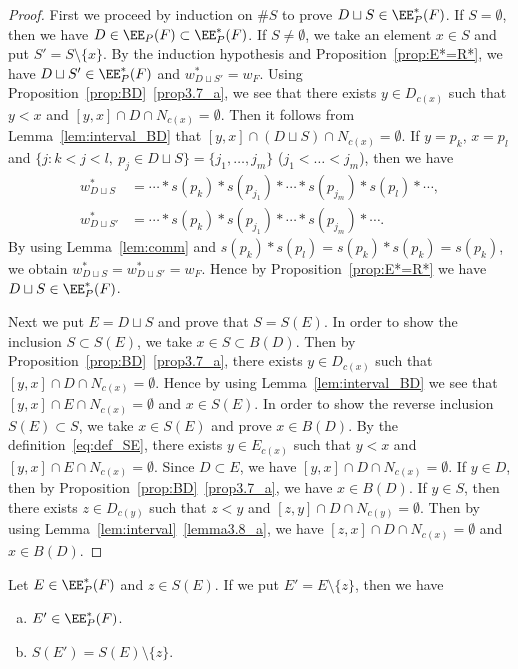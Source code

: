 \begin{proof}
First we proceed by induction on $\# S$ to prove $D \sqcup S \in \EE^*_P(F)$.
If $S = \emptyset$, then we have $D \in \EE_P(F) \subset \EE^*_P(F)$.
If $S \neq \emptyset$, we take an element $x \in S$ and put $S' = S \setminus \{ x \}$.
By the induction hypothesis and Proposition~\ref{prop:E*=R*}, 
we have $D \sqcup S' \in \EE^*_P(F)$ and $w^*_{D \sqcup S'} = w_F$.
Using Proposition~\ref{prop:BD}~\ref{prop3.7_a}, we see that there exists $y \in D_{c(x)}$ 
such that $y<x$ and $[y,x] \cap D \cap N_{c(x)} = \emptyset$.
Then it follows from Lemma~\ref{lem:interval_BD} that $[y,x] \cap (D \sqcup S) \cap N_{c(x)} = \emptyset$.
If $y = p_k$, $x = p_l$ and $\{ j : k < j < l, \ p_j \in D \sqcup S \} = \{ j_1, \dots, j_m \}$ 
($j_1 < \dots < j_m$), then we have 
\begin{align*}
w^*_{D \sqcup S} &= \cdots * s(p_k) * s(p_{j_1}) * \cdots * s(p_{j_m}) * s(p_l) * \cdots,
\\
w^*_{D \sqcup S'} &= \cdots * s(p_k) * s(p_{j_1}) * \cdots * s(p_{j_m}) * \cdots.
\end{align*}
By using Lemma~\ref{lem:comm} and $s(p_k)*s(p_l) = s(p_k) * s(p_k) = s(p_k)$, 
we obtain $w^*_{D \sqcup S} = w^*_{D \sqcup S'} = w_F$.
Hence by Proposition~\ref{prop:E*=R*} we have $D \sqcup S \in \EE^*_P(F)$.

Next we put $E = D \sqcup S$ and prove that $S = S(E)$.
In order to show the inclusion $S \subset S(E)$, we take $x \in S \subset B(D)$.
Then by Proposition~\ref{prop:BD}~\ref{prop3.7_a}, there exists $y \in D_{c(x)}$ 
such that $[y,x] \cap D \cap N_{c(x)} = \emptyset$.
Hence by using Lemma~\ref{lem:interval_BD} we see that $[y,x] \cap E \cap N_{c(x)} = \emptyset$ 
and $x \in S(E)$.
In order to show the reverse inclusion $S(E) \subset S$, we take $x \in S(E)$ and prove $x \in B(D)$.
By the definition~\eqref{eq:def_SE}, there exists $y \in E_{c(x)}$ 
such that $y < x$ and $[y,x] \cap E \cap N_{c(x)} = \emptyset$.
Since $D \subset E$, we have $[y,x] \cap D \cap N_{c(x)} = \emptyset$.
If $y \in D$, then by Proposition~\ref{prop:BD}~\ref{prop3.7_a}, we have $x \in B(D)$.
If $y \in S$, then there exists $z \in D_{c(y)}$ such that $z<y$ and $[z,y] \cap D \cap N_{c(y)} = \emptyset$.
Then by using Lemma~\ref{lem:interval}~\ref{lemma3.8_a}, we have $[z,x] \cap D \cap N_{c(x)} = \emptyset$ and $x \in B(D)$.
\end{proof}

\eject
\begin{lemm}
\label{lem:SE3}
Let $E \in \EE^*_P(F)$ and $z \in S(E)$. If we put $E' = E \setminus \{ z \}$, then we have
\begin{enumerate}[(a)]
\item\label{lemma3.17_a} %
$E' \in \EE^*_P(F)$.
\item\label{lemma3.17_b} %
$S( E' ) = S(E) \setminus \{ z \}$.
\end{enumerate}
\end{lemm}


